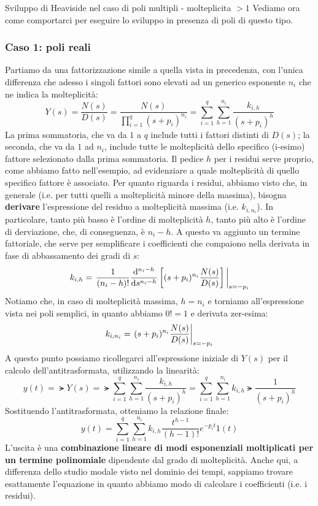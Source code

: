 \begin{defin}{Sviluppo di Heaviside nel caso di poli multipli - molteplicita $> 1$}{}
Vediamo ora come comportarci per eseguire lo sviluppo in presenza di poli di questo tipo.
\subsubsection{Caso 1: poli reali}
Partiamo da una fattorizzazione simile a quella vista in precedenza, con l'unica differenza che adesso i singoli fattori sono elevati ad un generico esponente $n_i$ che ne indica la molteplicità:
\begin{equation}
Y(s) = \frac{N(s)}{D(s)} = \frac{N(s)}{\prod_{i=1}^q (s+p_i)^{n_i}} = \sum_{i=1}^q \sum_{h=1}^{n_i} \frac{k_{i,h}}{(s+p_i)^h}
\end{equation}
La prima sommatoria, che va da $1$ a $q$ include tutti i fattori distinti di $D(s)$; la seconda, che va da $1$ ad $n_i$, include tutte le molteplicità dello specifico (i-esimo) fattore selezionato dalla prima sommatoria. Il pedice $h$ per i residui serve proprio, come abbiamo fatto nell'esempio, ad evidenziare a quale molteplicità di quello specifico fattore è associato.
\bb
Per quanto riguarda i residui, abbiamo visto che, in generale (i.e. per tutti quelli a molteplicità minore della massima), bisogna \textbf{derivare} l'espressione del residuo a molteplicità massima (i.e. $k_{i,n_i}$). In particolare, tanto più basso è l'ordine di molteplicità $h$, tanto più alto è l'ordine di derviazione, che, di conseguenza, è $n_i-h$. A questo va aggiunto un termine fattoriale, che serve per semplificare i coefficienti che compaiono nella derivata in fase di abbassamento dei gradi di $s$:
\begin{equation}
k_{i,h} = \eval{\frac{1}{(n_i-h)!}\dv[n_i - h]{s}\sparen{(s+p_i)^{n_i}\frac{N(s)}{D(s)}}}_{s=-p_i}
\end{equation}
Notiamo che, in caso di molteplicità massima, $h=n_i$ e torniamo all'espressione vista nei poli semplici, in quanto abbiamo $0! = 1$ e derivata zer-esima:
\begin{equation}
k_{i,n_i} = \eval{(s+p_i)^{n_i}\frac{N(s)}{D(s)}}_{s=-p_i}
\end{equation}
A questo punto possiamo ricollegarci all'espressione iniziale di $Y(s)$ per il calcolo dell'antitrasformata, utilizzando la linearità:
\begin{equation*}
y(t) = \lat{Y(s)} = \lat{\sum_{i=1}^q \sum_{h=1}^{n_i} \frac{k_{i,h}}{(s+p_i)^h}} = \sum_{i=1}^q \sum_{h=1}^{n_i} k_{i,h} \lat{\frac{1}{(s+p_i)^h}}
\end{equation*}
Sostituendo l'antitrasformata, otteniamo la relazione finale:
\begin{equation}
\boxed{y(t) = \sum_{i=1}^q \sum_{h=1}^{n_i} k_{i,h} \frac{t^{h-1}}{(h-1)!}e^{-p_it}1(t)}
\end{equation}
L'uscita è una \textbf{combinazione lineare di modi esponenziali moltiplicati per un termine polinomiale} dipendente dal grado di molteplicità. Anche qui, a differenza dello studio modale visto nel dominio dei tempi, sappiamo trovare esattamente l'equazione in quanto abbiamo modo di calcolare i coefficienti (i.e. i residui).

\end{defin}
